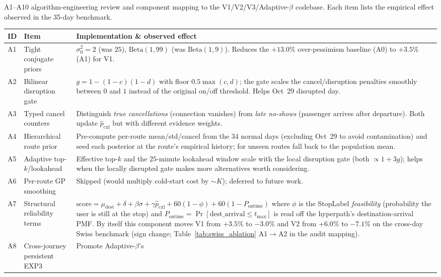 \documentclass[opre,dblanonrev]{informs4}
\begin{document}
\begin{APPENDICES}
\begin{table}
\TABLE
{A1--A10 algorithm-engineering review and component mapping
to the V1/V2/V3/Adaptive-$\beta$ codebase. Each item lists the
empirical effect observed in the 35-day benchmark.\label{tab:a1a10}}
{\scriptsize\begin{tabular}{l p{3.4cm} p{5.6cm}}
\toprule
ID & Item & Implementation \& observed effect \\
\midrule
A1 & Tight conjugate priors  & $\sigma_0^2=2$ (was $25$),
$\mathrm{Beta}(1,99)$ (was $\mathrm{Beta}(1,9)$). Reduces the
$+13.0\%$ over-pessimism baseline (A0) to $+3.5\%$ (A1) for V1. \\
A2 & Bilinear disruption gate & $g = 1{-}(1{-}c)(1{-}d)$ with floor
$0.5\max(c,d)$; the gate scales the cancel/disruption penalties
smoothly between $0$ and $1$ instead of the original on/off
threshold. Helps Oct~29 disrupted day. \\
A3 & Typed cancel counters    & Distinguish \emph{true cancellations}
(connection vanishes) from \emph{late no-shows} (passenger arrives
after departure). Both update $\hat p_{\mathrm{cxl}}$ but with
different evidence weights. \\
A4 & Hierarchical route prior & Pre-compute per-route mean/std/cancel
from the $34$ normal days (excluding Oct~29 to avoid contamination)
and seed each posterior at the route's empirical history; for unseen
routes fall back to the population mean. \\
A5 & Adaptive top-$k$/lookahead & Effective top-$k$ and the
$25$-minute lookahead window scale with the local disruption gate
(both $\propto 1{+}3g$); helps when the locally disrupted gate makes
more alternatives worth considering. \\
A6 & Per-route GP smoothing & Skipped (would multiply cold-start cost
by $\sim K$); deferred to future work. \\
A7 & Structural reliability terms &
$\mathrm{score}=\mu_{\text{dest}}+\delta+\beta\sigma+\gamma\hat p_{\mathrm{cxl}}+60(1{-}\phi)+60(1{-}P_{\text{ontime}})$
where $\phi$ is the StopLabel \emph{feasibility} (probability the
user is still at the stop) and $P_{\text{ontime}}=\Pr[\mathrm{
dest\_arrival}\leq t_{\max}]$ is read off the hyperpath's
destination-arrival PMF. By itself this component moves V1 from $+3.5\%$
to $-3.0\%$ and V2 from $+6.0\%$ to $-7.1\%$ on the cross-day
Swiss benchmark (sign change; Table~\ref{tab:swiss_ablation}
A1$\to$A2 in the audit mapping). \\
A8 & Cross-journey persistent EXP3 & Promote Adaptive-$\beta$'s

\end{tabular}}
\end{table}
\end{APPENDICES}
\end{document}
